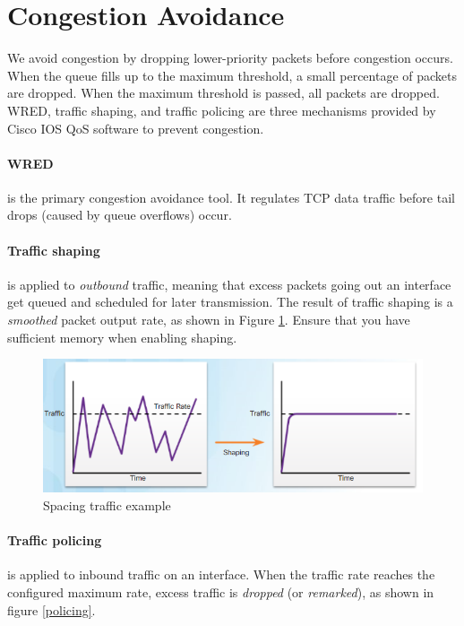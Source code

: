 \section{Congestion Avoidance}

We avoid congestion by dropping lower-priority packets before congestion occurs. When the queue fills up to the maximum threshold, a small percentage of packets are dropped. When the maximum threshold is passed, all packets are dropped. WRED, traffic shaping, and traffic policing are three mechanisms provided by Cisco IOS QoS software to prevent congestion. 

\paragraph{WRED} is the primary congestion avoidance tool. It regulates TCP data traffic before tail drops (caused by queue overflows) occur.

\paragraph{Traffic shaping}is applied to \emph{outbound} traffic, meaning that excess packets going out an interface get queued and scheduled for later transmission. The result of traffic shaping is a \emph{smoothed} packet output rate, as shown in Figure \ref{Spacing}. Ensure that you have sufficient memory when enabling shaping.\\

\begin{figure}[hbtp]
\caption{Spacing traffic example}\label{Spacing}
\centering
\includegraphics[scale=0.7]{pictures/Spacing.PNG}
\end{figure}

\paragraph{Traffic policing}is applied to inbound traffic on an interface. When the traffic rate reaches the configured maximum rate, excess traffic is \emph{dropped} (or \emph{remarked}), as shown in figure \ref{policing}.\\

